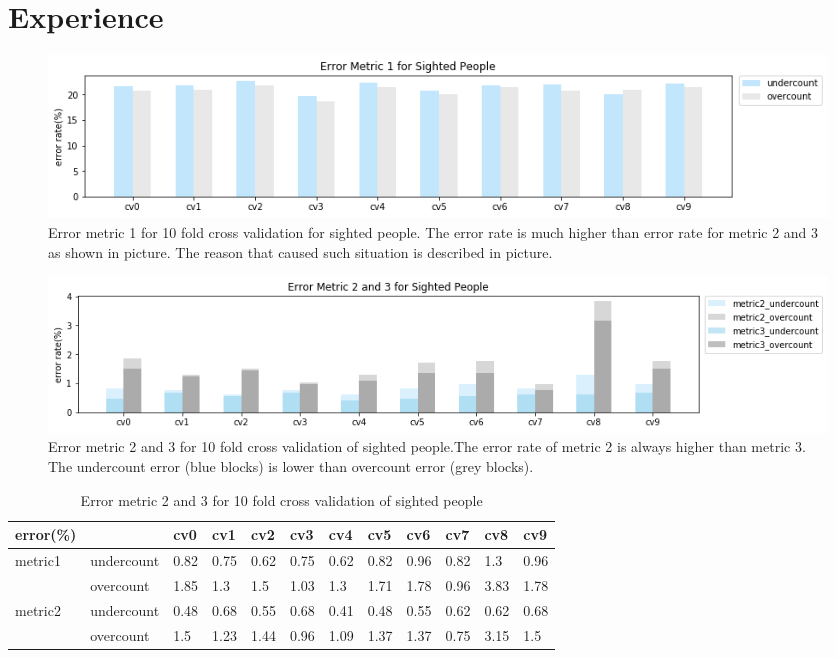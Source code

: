 \documentclass[11pt]{article}
\begin{document}
\section{Experience}

\begin{figure}[ht]
\centering
\includegraphics[scale=0.5]{error_metric_1_na_10fold}
\caption{Error metric 1 for 10 fold cross validation for sighted people. The error rate is much higher than error rate for metric 2 and 3 as shown in picture. The reason that caused such situation is described in picture.}
\label{fig:label}
\end{figure}


\begin{figure}[ht]
\centering
\includegraphics[scale=0.5]{error_metric_23_na_10fold}
\caption{Error metric 2 and 3 for 10 fold cross validation of sighted people.The error rate of metric 2 is always higher than metric 3. The undercount error (blue blocks) is lower than overcount error (grey blocks).}
\label{fig:label}
\end{figure}

\begin{table}[]
\centering
\caption{Error metric 2 and 3 for 10 fold cross validation of sighted people}
\label{my-label}
\begin{tabular}{llllllllllll}
\hline
error(\%)                &            & cv0   & cv1   & cv2   & cv3   & cv4   & cv5   & cv6   & cv7   & cv8   & cv9  \\ \hline
metric1                  & undercount & 0.82  & 0.75  & 0.62  & 0.75  & 0.62  & 0.82  & 0.96  & 0.82  & 1.3   & 0.96 \\
                         & overcount  & 1.85  & 1.3   & 1.5   & 1.03  & 1.3   & 1.71  & 1.78  & 0.96  & 3.83  & 1.78 \\ \hline
\multirow{2}{*}{metric2} & undercount & 0.48  & 0.68  & 0.55  & 0.68  & 0.41  & 0.48  & 0.55  & 0.62  & 0.62  & 0.68 \\
                         & overcount  & 1.5   & 1.23  & 1.44  & 0.96  & 1.09  & 1.37  & 1.37  & 0.75  & 3.15  & 1.5  \\ \hline
\end{tabular}
\end{table}
\end{document}
